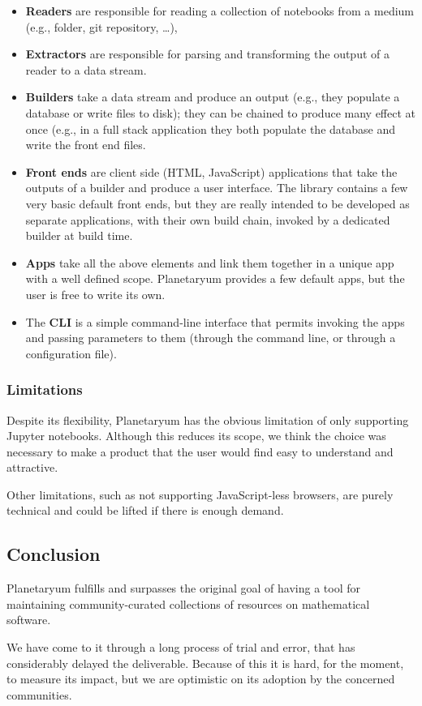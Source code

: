 \begin{itemize}
\item
  \textbf{Readers} are responsible for reading a collection of notebooks
  from a medium (e.g., folder, git repository, \ldots{}),
\item
  \textbf{Extractors} are responsible for parsing and transforming the
  output of a reader to a data stream.
\item
  \textbf{Builders} take a data stream and produce an output (e.g., they
  populate a database or write files to disk); they can be chained to
  produce many effect at once (e.g., in a full stack application they
  both populate the database and write the front end files.
\item
  \textbf{Front ends} are client side (HTML, JavaScript) applications
  that take the outputs of a builder and produce a user interface. The
  library contains a few very basic default front ends, but they are
  really intended to be developed as separate applications, with their
  own build chain, invoked by a dedicated builder at build time.
\item
  \textbf{Apps} take all the above elements and link them together in a
  unique app with a well defined scope. Planetaryum provides a few
  default apps, but the user is free to write its own.
\item
  The \textbf{CLI} is a simple command-line interface that permits
  invoking the apps and passing parameters to them (through the command
  line, or through a configuration file).
\end{itemize}

\hypertarget{limitations}{%
\subsubsection{Limitations}\label{limitations}}

Despite its flexibility, Planetaryum has the obvious limitation of only
supporting Jupyter notebooks. Although this reduces its scope, we think
the choice was necessary to make a product that the user would find easy
to understand and attractive.

Other limitations, such as not supporting JavaScript-less browsers, are
purely technical and could be lifted if there is enough demand.

\hypertarget{conclusion}{%
\subsection{Conclusion}\label{conclusion}}

Planetaryum fulfills and surpasses the original goal of having a tool
for maintaining community-curated collections of resources on
mathematical software.

We have come to it through a long process of trial and error, that has
considerably delayed the deliverable. Because of this it is hard, for
the moment, to measure its impact, but we are optimistic on its adoption
by the concerned communities.
